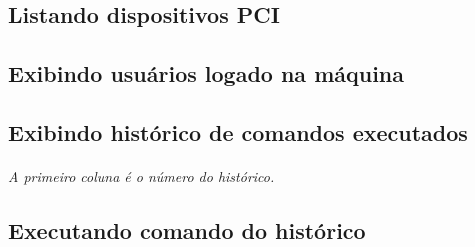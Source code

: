 \documentclass[a4paper,9pt]{extarticle}
\begin{document}
\begin{multicols}{2}
\subsection{Listando dispositivos PCI}
	
	
\subsection{Exibindo usuários logado na máquina}

	
\subsection{Exibindo histórico de comandos executados} 
	
	\paragraph{} \emph{A primeiro coluna é o número do histórico.}
	
\subsection{Executando comando do histórico}



\end{multicols}
\end{document}
